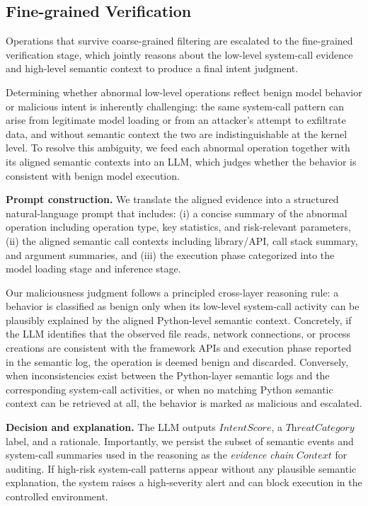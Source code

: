 \subsection{Fine-grained Verification}

Operations that survive coarse-grained filtering are escalated to the fine-grained verification stage, which jointly reasons about the low-level system-call evidence and high-level semantic context to produce a final intent judgment.

Determining whether abnormal low-level operations reflect benign model behavior or malicious intent is inherently challenging: the same system-call pattern can arise from legitimate model loading or from an attacker's attempt to exfiltrate data, and without semantic context the two are indistinguishable at the kernel level. To resolve this ambiguity, we feed each abnormal operation together with its aligned semantic contexts into an LLM, which judges whether the behavior is consistent with benign model execution.

\noindent \textbf{Prompt construction.}
We translate the aligned evidence into a structured natural-language prompt that includes: (i) a concise summary of the abnormal operation including operation type, key statistics, and risk-relevant parameters, (ii) the aligned semantic call contexts including library/API, call stack summary, and argument summaries, and (iii) the execution phase categorized into the model loading stage and inference stage.

Our maliciousness judgment follows a principled cross-layer reasoning rule: a behavior is classified as benign only when its low-level system-call activity can be plausibly explained by the aligned Python-level semantic context. Concretely, if the LLM identifies that the observed file reads, network connections, or process creations are consistent with the framework APIs and execution phase reported in the semantic log, the operation is deemed benign and discarded. Conversely, when inconsistencies exist between the Python-layer semantic logs and the corresponding system-call activities, or when no matching Python semantic context can be retrieved at all, the behavior is marked as malicious and escalated.

\noindent \textbf{Decision and explanation.}
The LLM outputs $\textit{IntentScore}$, a $\textit{ThreatCategory}$ label, and a rationale. Importantly, we persist the subset of semantic events and system-call summaries used in the reasoning as the \emph{evidence chain} $\textit{Context}$ for auditing.
If high-risk system-call patterns appear without any plausible semantic explanation, the system raises a high-severity alert and can block execution in the controlled environment.


